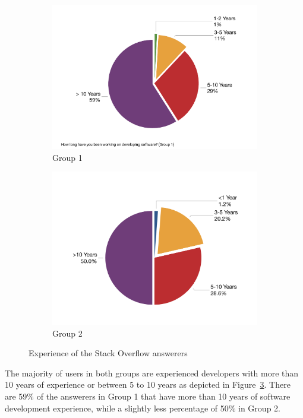 \documentclass{svjour3}                     %
\begin{document}

\begin{figure}
	\begin{subfigure}{.5\textwidth}
		\centering
		\includegraphics[width=0.8\linewidth]{survey_exp_1}
		\caption{Group 1}
		\label{fig:survey_group1_exp}
	\end{subfigure}%
	\begin{subfigure}{.5\textwidth}
		\centering
		\includegraphics[width=0.8\linewidth]{survey_exp_2}
		\caption{Group 2}
		\label{fig:survey_group2_exp}
	\end{subfigure}
	\caption{Experience of the Stack Overflow answerers}
	\label{fig:survey_exp}
\end{figure}

The majority of users in both groups are experienced developers with more than
10 years of experience or between 5 to 10 years as depicted in
Figure~\ref{fig:survey_exp}. There are 59\% of the answerers in Group 1 that
have more than 10 years of software development experience, while a slightly
less percentage of 50\% in Group 2.
\end{document}
